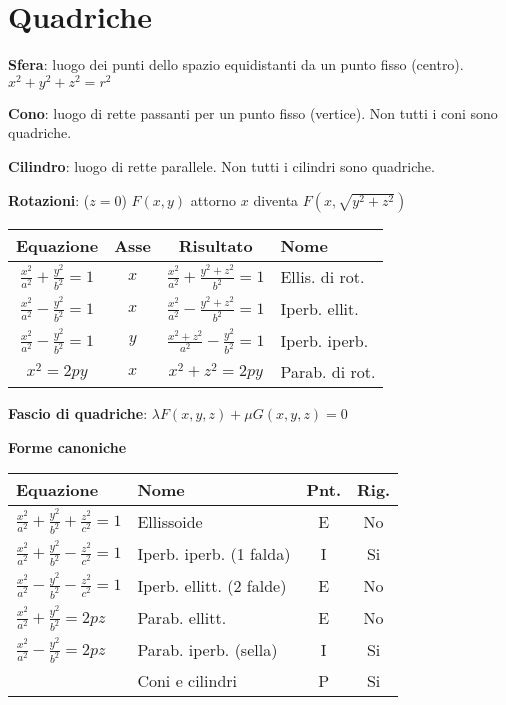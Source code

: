 \section{Quadriche}

\textbf{Sfera}: luogo dei punti dello spazio equidistanti da un punto fisso (centro). $x^2+y^2+z^2=r^2$

\textbf{Cono}: luogo di rette passanti per un punto fisso (vertice). Non tutti i coni sono quadriche.

\textbf{Cilindro}: luogo di rette parallele. Non tutti i cilindri sono quadriche.

\textbf{Rotazioni}: ($z = 0$) $F(x, y)$ attorno $x$ diventa $F(x, \sqrt{y^2+z^2})$

\begin{tabular}{cccl}
	\textbf{Equazione} & \textbf{Asse} & \textbf{Risultato} & \textbf{Nome} \\
	\hline
	$\frac{x^2}{a^2}+\frac{y^2}{b^2}=1$ & $x$ & $\frac{x^2}{a^2}+\frac{y^2+z^2}{b^2}=1$ & Ellis. di rot. \\
	$\frac{x^2}{a^2}-\frac{y^2}{b^2}=1$ & $x$ & $\frac{x^2}{a^2}-\frac{y^2+z^2}{b^2}=1$ & Iperb. ellit. \\
	$\frac{x^2}{a^2}-\frac{y^2}{b^2}=1$ & $y$ & $\frac{x^2+z^2}{a^2}-\frac{y^2}{b^2}=1$ & Iperb. iperb. \\
	$x^2=2py$ & $x$ & $x^2+z^2=2py$ & Parab. di rot.
\end{tabular}

\textbf{Fascio di quadriche}: $\lambda F(x, y, z) + \mu G(x, y, z) = 0$

\textbf{Forme canoniche}
\begin{tabular}{llcc}
	\textbf{Equazione} & \textbf{Nome} & \textbf{Pnt.} & \textbf{Rig.} \\
	\hline
	$\frac{x^2}{a^2} + \frac{y^2}{b^2} + \frac{z^2}{c^2} = 1$ & Ellissoide & E & No \\
	$\frac{x^2}{a^2} + \frac{y^2}{b^2} - \frac{z^2}{c^2} = 1$ & Iperb. iperb. (1 falda) & I & Si \\
	$\frac{x^2}{a^2} - \frac{y^2}{b^2} - \frac{z^2}{c^2} = 1$ & Iperb. ellitt. (2 falde) & E & No \\
	$\frac{x^2}{a^2} + \frac{y^2}{b^2} = 2pz$ & Parab. ellitt. & E & No \\
	$\frac{x^2}{a^2} - \frac{y^2}{b^2} = 2pz$ & Parab. iperb. (sella) & I & Si \\
	 & Coni e cilindri & P & Si \\
\end{tabular}

